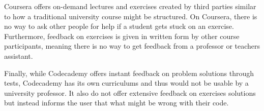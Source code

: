 Coursera offers on-demand lectures and exercises created by third parties similar to how a traditional university course might be structured.
On Coursera, there is no way to ask other people for help if a student gets stuck on an exercise.
Furthermore, feedback on exercises is given in written form by other course participants, meaning there is no way to get feedback from a professor or teachers assistant. 


Finally, while Codecademy offers instant feedback on problem solutions through tests, Codecademy has its own curriculums and thus would not be usable by a university professor. 
It also do not offer extensive feedback on exercises solutions but instead informs the user that what might be wrong with their code. 
